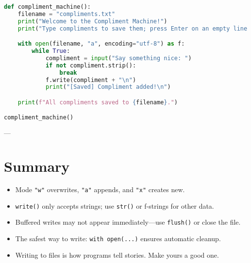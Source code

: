 \begin{lstlisting}[language=Python, caption={Example 7: The Compliment Machine.}]
def compliment_machine():
    filename = "compliments.txt"
    print("Welcome to the Compliment Machine!")
    print("Type compliments to save them; press Enter on an empty line to quit.\n")

    with open(filename, "a", encoding="utf-8") as f:
        while True:
            compliment = input("Say something nice: ")
            if not compliment.strip():
                break
            f.write(compliment + "\n")
            print("[Saved] Compliment added!\n")

    print(f"All compliments saved to {filename}.")

compliment_machine()
\end{lstlisting}

---

\section*{Summary}
\begin{itemize}
  \item Mode \texttt{"w"} overwrites, \texttt{"a"} appends, and \texttt{"x"} creates new.
  \item \texttt{write()} only accepts strings; use \texttt{str()} or f-strings for other data.
  \item Buffered writes may not appear immediately—use \texttt{flush()} or close the file.
  \item The safest way to write: \texttt{with open(...)} ensures automatic cleanup.
  \item Writing to files is how programs tell stories. Make yours a good one.
\end{itemize}
